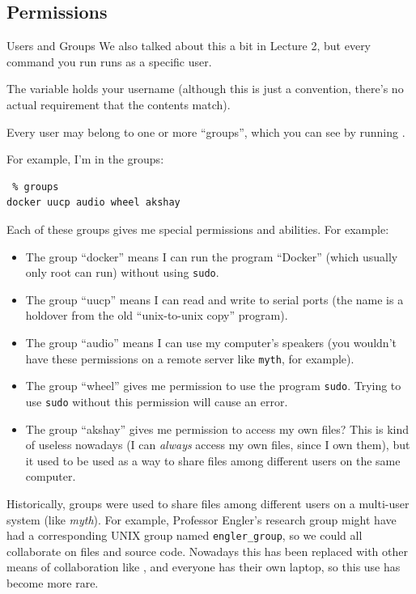 \subsection{Permissions}

\begin{frame}[fragile]{Users and Groups}
  We also talked about this a bit in Lecture 2, but every command you run runs
  as a specific user.

  \pause

  The variable  holds your username (although this is just a
  convention, there's no actual requirement that the contents match).

  \pause

  Every user may belong to one or more \enquote{groups}, which you can see by
  running .

  For example, I'm in the groups:
  \begin{verbatim}
 % groups
docker uucp audio wheel akshay
  \end{verbatim}

   {
    Each of these groups gives me special permissions and abilities.  For
    example:

    \begin{itemize}
      \item The group \enquote{docker} means I can run the program
        \enquote{Docker} (which usually only root can run) without using
        \texttt{sudo}.
      \item The group \enquote{uucp} means I can read and write to
        serial ports (the name is a holdover from the old \enquote{unix-to-unix
        copy} program).
      \item The group \enquote{audio} means I can use my computer's
        speakers (you wouldn't have these permissions on a remote server like \texttt{myth}, for example).
      \item The group \enquote{wheel} gives me permission to use the program
        \texttt{sudo}.  Trying to use \texttt{sudo} without this permission
        will cause an error.
      \item The group \enquote{akshay} gives me permission to\textellipsis{}
        access my own files?  This is kind of useless nowadays (I can
        \textit{always} access my own files, since I own them), but it used to
        be used as a way to share files among different users on the same
        computer.
    \end{itemize}

    Historically, groups were used to share files among different users on a
    multi-user system (like \textit{myth}).  For example, Professor Engler's
    research group might have had a corresponding UNIX group named
    \texttt{engler\_group}, so we could all collaborate on files and source
    code.  Nowadays this has been replaced with other means of collaboration
    like , and everyone has their own laptop, so this use has become
    more rare.
  }
\end{frame}

